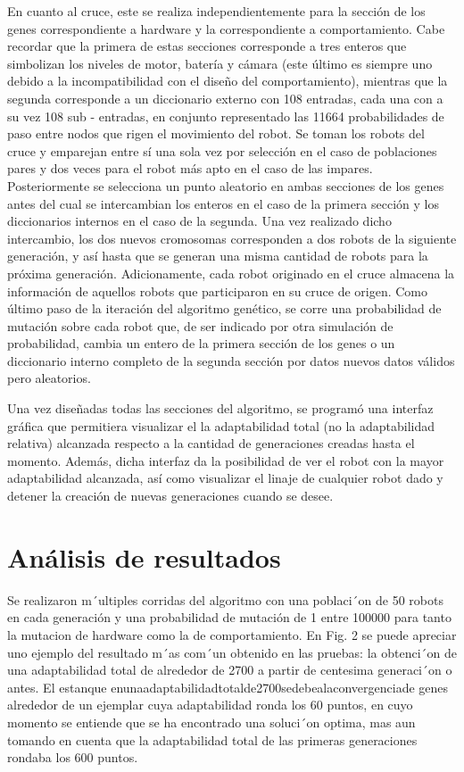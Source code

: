 \documentclass[conference]{IEEEtran}
\begin{document}
En cuanto al cruce, este se realiza independientemente para la sección de los genes correspondiente a hardware y la correspondiente a comportamiento. Cabe recordar que la primera de estas secciones corresponde a tres enteros que simbolizan los niveles de motor, batería y cámara (este último es siempre uno debido a la incompatibilidad con el diseño del comportamiento), mientras que la segunda corresponde a un diccionario externo con 108 entradas, cada una con a su vez 108 sub - entradas, en conjunto representado las 11664 probabilidades de paso entre nodos que rigen el movimiento del robot. Se toman los robots del cruce y emparejan entre sí una sola vez por selección en el caso de poblaciones pares y dos veces para el robot más apto en el caso de las impares. Posteriormente se selecciona un punto aleatorio en ambas secciones de los genes antes del cual se intercambian los enteros en el caso de la primera sección y los diccionarios internos en el caso de la segunda. Una vez realizado dicho intercambio, los dos nuevos cromosomas corresponden a dos robots de la siguiente generación, y así hasta que se generan una misma cantidad de robots para la próxima generación. Adicionamente, cada robot originado en el cruce almacena la información de aquellos robots que participaron en su cruce de origen. Como último paso de la iteración del algoritmo genético, se corre una probabilidad de mutación sobre cada robot que, de ser indicado por otra simulación de probabilidad, cambia un entero de la primera sección de los genes o un diccionario interno completo de la segunda sección por datos nuevos datos válidos pero aleatorios.

Una vez diseñadas todas las secciones del algoritmo, se programó una interfaz gráfica que permitiera visualizar el la adaptabilidad total (no la adaptabilidad relativa) alcanzada respecto a la cantidad de generaciones creadas hasta el momento. Además, dicha interfaz da la posibilidad de ver el robot con la mayor adaptabilidad alcanzada, así como visualizar el linaje de cualquier robot dado y detener la creación de nuevas generaciones cuando se desee.
\section{Análisis de resultados}

Se realizaron m´ultiples corridas del algoritmo con una poblaci´on de 50 robots en cada generación y una probabilidad de mutación de 1 entre 100000 para tanto la mutacion de hardware como la de comportamiento. En Fig. 2 se puede apreciar uno ejemplo del resultado m´as com´un obtenido en las pruebas: la obtenci´on de una adaptabilidad total de alrededor de 2700 a partir de centesima generaci´on o antes. El estanque enunaadaptabilidadtotalde2700sedebealaconvergenciade genes alrededor de un ejemplar cuya adaptabilidad ronda los 60 puntos, en cuyo momento se entiende que se ha encontrado una soluci´on optima, mas aun tomando en cuenta que la adaptabilidad total de las primeras generaciones rondaba los 600 puntos.
\end{document}
